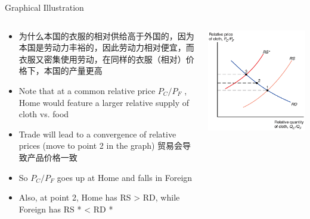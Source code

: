 \documentclass[10pt,hyperref={CJKbookmarks=true},xcolor=dvipsnames,aspectratio=169]{beamer}
\begin{document}
\begin{frame}{Graphical Illustration }


\begin{columns}[onlytextwidth]
\begin{column}{0.6\textwidth}
\begin{itemize}
\item 为什么本国的衣服的相对供给高于外国的，因为本国是劳动力丰裕的，因此劳动力相对便宜，而衣服又密集使用劳动，在同样的衣服（相对）价格下，本国的产量更高
\item Note that at a common relative price $P_{C}/P_{F}$ , Home would feature
a larger relative supply of cloth vs. food
\item Trade will lead to a convergence of relative prices (move to point
2 in the graph) 贸易会导致产品价格一致
\item So $P_{C}/P_{F}$ goes up at Home and falls in Foreign 
\item Also, at point 2, Home has RS > RD, while Foreign has RS {*} < RD
{*} 
\end{itemize}

\end{column}
\begin{column}{0.4\textwidth}
\includegraphics[width=\columnwidth]{fig/ho/lec5-23}
\end{column}
\end{columns}

\end{frame}
\end{document}
